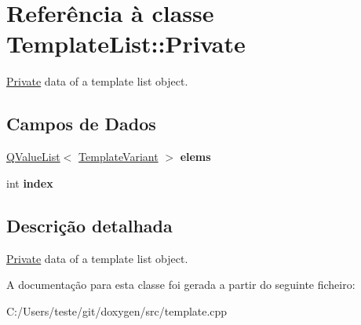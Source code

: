 \hypertarget{class_template_list_1_1_private}{\section{Referência à classe Template\-List\-:\-:Private}
\label{class_template_list_1_1_private}
}


\hyperlink{class_template_list_1_1_private}{Private} data of a template list object.  


\subsection*{Campos de Dados}
\begin{DoxyCompactItemize}
\item 
\hypertarget{class_template_list_1_1_private_a68c3637bab13053f08d4fb911fee34a7}{\hyperlink{class_q_value_list}{Q\-Value\-List}$<$ \hyperlink{class_template_variant}{Template\-Variant} $>$ {\bfseries elems}}\label{class_template_list_1_1_private_a68c3637bab13053f08d4fb911fee34a7}

\item 
\hypertarget{class_template_list_1_1_private_a750b5d744c39a06bfb13e6eb010e35d0}{int {\bfseries index}}\label{class_template_list_1_1_private_a750b5d744c39a06bfb13e6eb010e35d0}

\end{DoxyCompactItemize}


\subsection{Descrição detalhada}
\hyperlink{class_template_list_1_1_private}{Private} data of a template list object. 

A documentação para esta classe foi gerada a partir do seguinte ficheiro\-:\begin{DoxyCompactItemize}
\item 
C\-:/\-Users/teste/git/doxygen/src/template.\-cpp\end{DoxyCompactItemize}

